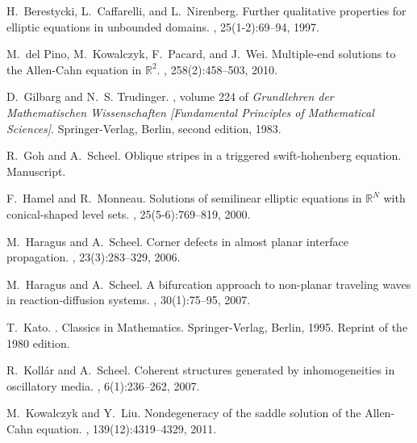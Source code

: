\documentclass[10pt]{article}
\newcommand{\R}{\mathbb{R}}
\begin{document}
\begin{thebibliography}{10}

H.~Berestycki, L.~Caffarelli, and L.~Nirenberg.
\newblock Further qualitative properties for elliptic equations in unbounded
  domains.
, 25(1-2):69--94, 1997.

M.~del Pino, M.~Kowalczyk, F.~Pacard, and J.~Wei.
\newblock Multiple-end solutions to the {A}llen-{C}ahn equation in {$\R^2$}.
, 258(2):458--503, 2010.

D.~Gilbarg and N.~S. Trudinger.
, volume
  224 of {\em Grundlehren der Mathematischen Wissenschaften [Fundamental
  Principles of Mathematical Sciences]}.
\newblock Springer-Verlag, Berlin, second edition, 1983.

R.~Goh and A.~Scheel.
\newblock Oblique stripes in a triggered swift-hohenberg equation.
\newblock Manuscript.

F.~Hamel and R.~Monneau.
\newblock Solutions of semilinear elliptic equations in {${\R^N}$} with
  conical-shaped level sets.
, 25(5-6):769--819, 2000.

M.~Haragus and A.~Scheel.
\newblock Corner defects in almost planar interface propagation.
, 23(3):283--329,
  2006.

M.~Haragus and A.~Scheel.
\newblock A bifurcation approach to non-planar traveling waves in
  reaction-diffusion systems.
, 30(1):75--95, 2007.

T.~Kato.
.
\newblock Classics in Mathematics. Springer-Verlag, Berlin, 1995.
\newblock Reprint of the 1980 edition.

R.~Koll\'ar and A.~Scheel.
\newblock Coherent structures generated by inhomogeneities in oscillatory
  media.
, 6(1):236--262, 2007.

M.~Kowalczyk and Y.~Liu.
\newblock Nondegeneracy of the saddle solution of the {A}llen-{C}ahn equation.
, 139(12):4319--4329, 2011.


\end{thebibliography}
\end{document}
